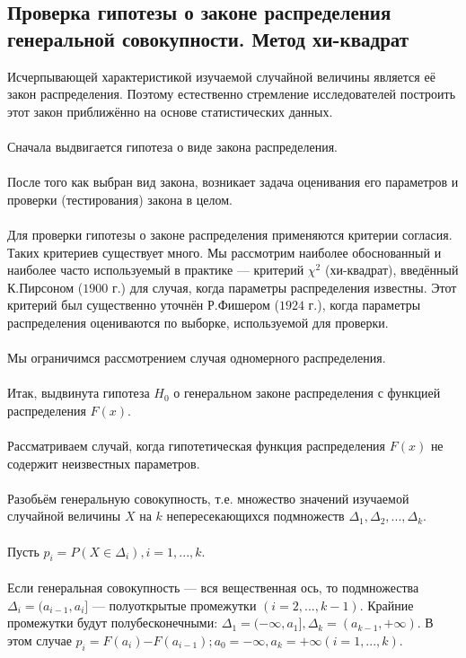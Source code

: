 \documentclass[../body.tex]{subfiles}
\begin{document}
	
	
	
	
	
	\subsection{Проверка гипотезы о законе распределения генеральной совокупности. Метод хи-квадрат}
	Исчерпывающей характеристикой изучаемой случайной величины является её закон распределения. Поэтому естественно стремление исследователей построить этот закон приближённо на основе статистических данных.
	\\ \\
	Сначала выдвигается гипотеза о виде закона распределения.\\\\
	После того как выбран вид закона, возникает задача оценивания его параметров и проверки (тестирования) закона в целом.
	\\ \\
	Для проверки гипотезы о законе распределения применяются критерии согласия. Таких критериев существует много. Мы рассмотрим наиболее обоснованный и наиболее часто используемый в практике — критерий $\chi^{2}$ (хи-квадрат), введённый К.Пирсоном ($1900$ г.) для случая, когда параметры распределения известны. Этот критерий был существенно уточнён Р.Фишером ($1924$ г.), когда параметры распределения оцениваются по выборке, используемой для проверки.
	\\ \\
	Мы ограничимся рассмотрением случая одномерного распределения.
	\\ \\
	Итак, выдвинута гипотеза $H_{0}$ о генеральном законе распределения с функцией распределения $F(x)$.
	\\ \\
	Рассматриваем случай, когда гипотетическая функция распределения $F(x)$ не содержит неизвестных параметров.
	\\ \\
	Разобьём генеральную совокупность, т.е. множество значений изучаемой случайной величины $X$ на $k$ непересекающихся подмножеств $\Delta_{1},\Delta_{2}, ... ,\Delta_{k}$.
	\\\\
	Пусть $p_{i} = P(X \in \Delta_{i}), i = 1, ... ,k$. 
	\\\\
	Если генеральная совокупность — вся вещественная ось, то подмножества $\Delta_{i} = (a_{i-1},a_{i}]$ — полуоткрытые промежутки $(i = 2, ... ,k-1)$. Крайние промежутки будут полубесконечными: $\Delta_{1} = (−\infty,a_{1}], \Delta_{k} = (a_{k-1},+\infty).$ В этом случае $p_{i} = F(a_{i})$$-$$F(a_{i-1}); a_{0} = −\infty, a_{k} = +\infty (i = 1, ... ,k).$
\end{document}

